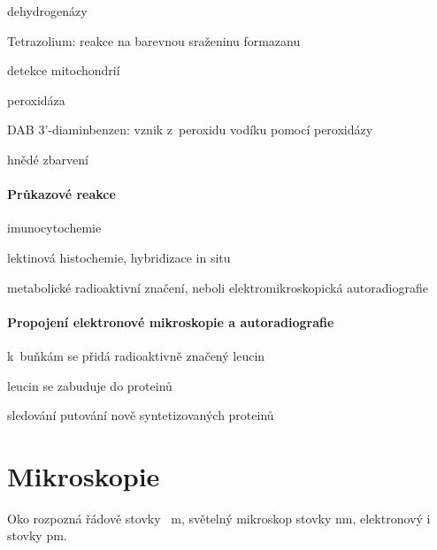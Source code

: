 \documentclass[DIV=8]{scrreprt}
\begin{document}
\begin{myItemize}[nosep]
\begin{myItemize}[nosep]
    \item dehydrogenázy
\begin{myItemize}[nosep]
    \item Tetrazolium: reakce na barevnou sraženinu formazanu
\end{myItemize}

    \item detekce mitochondrií
    \item peroxidáza
    \item DAB 3'-diaminbenzen: vznik z peroxidu vodíku pomocí peroxidázy
    \item hnědé zbarvení
\end{myItemize}

\end{myItemize}



\paragraph{Průkazové reakce}
\begin{myItemize}[nosep]
    \item imunocytochemie
    \item lektinová histochemie, hybridizace in situ
    \item metabolické radioaktivní značení, neboli elektromikroskopická autoradiografie
\end{myItemize}



\paragraph{Propojení elektronové mikroskopie a autoradiografie}
\begin{myItemize}[nosep]
    \item k buňkám se přidá radioaktivně značený leucin
    \item leucin se zabuduje do proteinů
    \item sledování putování nově syntetizovaných proteinů
\end{myItemize}



\section{Mikroskopie} \label{Mikroskopie} \FloatBarrier


Oko rozpozná řádově stovky \si{\mu m}, světelný mikroskop stovky \si{nm}, elektronový i stovky \si{pm}.
\end{document}
